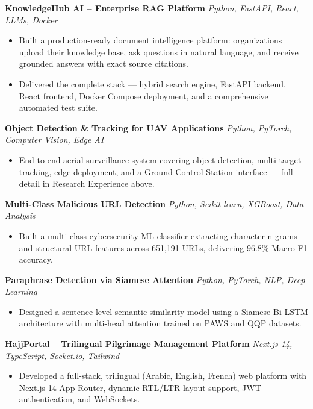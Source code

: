 \documentclass[10pt, letterpaper]{article}
\begin{document}
\vspace{3pt}

\textbf{KnowledgeHub AI -- Enterprise RAG Platform} \hfill \textit{Python, FastAPI, React, LLMs, Docker}
\begin{itemize}
  \item Built a production-ready document intelligence platform: organizations upload their knowledge base, ask questions in natural language, and receive grounded answers with exact source citations.
  \item Delivered the complete stack --- hybrid search engine, FastAPI backend, React frontend, Docker Compose deployment, and a comprehensive automated test suite.
\end{itemize}

\vspace{3pt}

\textbf{Object Detection \& Tracking for UAV Applications} \hfill \textit{Python, PyTorch, Computer Vision, Edge AI}
\begin{itemize}
  \item End-to-end aerial surveillance system covering object detection, multi-target tracking, edge deployment, and a Ground Control Station interface --- full detail in Research Experience above.
\end{itemize}

\vspace{3pt}

\textbf{Multi-Class Malicious URL Detection} \hfill \textit{Python, Scikit-learn, XGBoost, Data Analysis}
\begin{itemize}
  \item Built a multi-class cybersecurity ML classifier extracting character n-grams and structural URL features across 651,191 URLs, delivering 96.8\% Macro F1 accuracy.
\end{itemize}

\vspace{3pt}

\textbf{Paraphrase Detection via Siamese Attention} \hfill \textit{Python, PyTorch, NLP, Deep Learning}
\begin{itemize}
  \item Designed a sentence-level semantic similarity model using a Siamese Bi-LSTM architecture with multi-head attention trained on PAWS and QQP datasets.
\end{itemize}

\vspace{3pt}

\textbf{HajjPortal -- Trilingual Pilgrimage Management Platform} \hfill \textit{Next.js 14, TypeScript, Socket.io, Tailwind}
\begin{itemize}
  \item Developed a full-stack, trilingual (Arabic, English, French) web platform with Next.js 14 App Router, dynamic RTL/LTR layout support, JWT authentication, and WebSockets.
\end{itemize}
\end{document}

